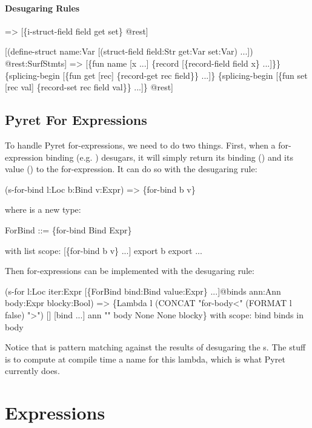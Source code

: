 \paragraph{Desugaring Rules}
\begin{Codes}
=> [\{i-struct-field field get set\} @rest]
  
   [(define-struct name:Var
      [(struct-field field:Str get:Var set:Var) ...]) @rest:SurfStmts]
=> [\{fun name [x ...] \{record [\{record-field field x\} ...]\}\}
    \{splicing-begin [\{fun get [rec] \{record-get rec field\}\} ...]\}
    \{splicing-begin [\{fun set [rec val] \{record-set rec field val\}\} ...]\}
    @rest]
\end{Codes}

\subsection{Pyret For Expressions}

To handle Pyret for-expressions, we need to do two things.
First, when a for-expression binding (e.g. ) desugars,
it will simply return its binding () and its value ()
to the for-expression. It can do so with the desugaring rule:
\begin{Codes}
   (s-for-bind l:Loc b:Bind v:Expr)
=> \{for-bind b v\}
\end{Codes}
where  is a new type:
\begin{Codes}
  ForBind ::= \{for-bind Bind Expr\}

with list scope:
  [\{for-bind b v\} ...]
  export b
  export ...
\end{Codes}

Then for-expressions can be implemented with the desugaring rule:
\begin{Codes}
   (s-for l:Loc
          iter:Expr
          [\{ForBind bind:Bind value:Expr\} ...]@binds
          ann:Ann
          body:Expr
          blocky:Bool)
=> \{Lambda l (CONCAT "for-body<" (FORMAT l false) ">")
     [] [bind ...] ann "" body None None blocky\}
with scope:
  bind binds in body
\end{Codes}

Notice that  is pattern matching against the results of
desugaring the s. The  stuff is to
compute at compile time a name for this lambda, which is what Pyret
currently does.

\section{Expressions}

